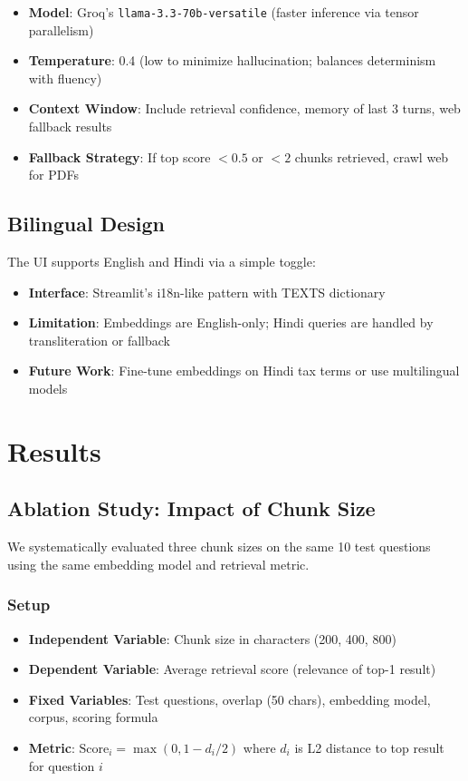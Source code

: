 \documentclass[11pt,a4paper]{article}
\begin{document}
\begin{itemize}
    \item \textbf{Model}: Groq's \texttt{llama-3.3-70b-versatile} (faster inference via tensor parallelism)
    \item \textbf{Temperature}: 0.4 (low to minimize hallucination; balances determinism with fluency)
    \item \textbf{Context Window}: Include retrieval confidence, memory of last 3 turns, web fallback results
    \item \textbf{Fallback Strategy}: If top score $< 0.5$ or $< 2$ chunks retrieved, crawl web for PDFs
\end{itemize}

\subsection{Bilingual Design}

The UI supports English and Hindi via a simple toggle:
\begin{itemize}
    \item \textbf{Interface}: Streamlit's i18n-like pattern with TEXTS dictionary
    \item \textbf{Limitation}: Embeddings are English-only; Hindi queries are handled by transliteration or fallback
    \item \textbf{Future Work}: Fine-tune embeddings on Hindi tax terms or use multilingual models
\end{itemize}

\section{Results}
\label{sec:results}

\subsection{Ablation Study: Impact of Chunk Size}

We systematically evaluated three chunk sizes on the same 10 test questions using the same embedding model and retrieval metric.

\subsubsection{Setup}

\begin{itemize}
    \item \textbf{Independent Variable}: Chunk size in characters (200, 400, 800)
    \item \textbf{Dependent Variable}: Average retrieval score (relevance of top-1 result)
    \item \textbf{Fixed Variables}: Test questions, overlap (50 chars), embedding model, corpus, scoring formula
    \item \textbf{Metric}: $\text{Score}_i = \max(0, 1 - d_i / 2)$ where $d_i$ is L2 distance to top result for question $i$
\end{itemize}
\end{document}
